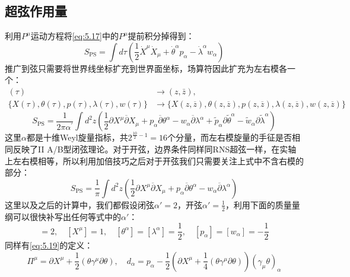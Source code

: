 \subsection{超弦作用量}
利用$P^\mu$运动方程将\ref{eq:5.17}中的$P^\mu$提前积分掉得到：
\begin{equation}
	S_{\mathrm{PS}}=\int d\tau\left(\frac{1}{2}\dot{X}^\mu\dot{X}_\mu+\dot{\theta}^\alpha p_\alpha-\dot{\lambda}^\alpha w_\alpha\right)
\end{equation}
推广到弦只需要将世界线坐标扩充到世界面坐标，场算符因此扩充为左右模各一个：
\begin{equation}
	\begin{aligned}(\tau)&\to(z,\bar{z}),\\\{X(\tau),\theta(\tau),p(\tau),\lambda(\tau),w(\tau)\}&\to\{X(z,\overline{z}),\theta(z,\overline{z}),p(z,\overline{z}),\lambda(z,\overline{z}),w(z,\overline{z})\}\end{aligned}
\end{equation}
\begin{equation}
	\boxed{
	S_{\mathrm{PS}}=\frac{1}{2\pi\alpha^{\prime}}\int d^2z\left(\frac{1}{2}\partial X^\mu\overline{\partial}X_\mu+p_\alpha\overline{\partial}\theta^\alpha-w_\alpha\overline{\partial}\lambda^\alpha+\tilde{p}_\alpha\partial\tilde{\theta}^\alpha-\tilde{w}_\alpha\partial\tilde{\lambda}^\alpha\right)
}
\end{equation}
这里$\alpha$都是十维Weyl旋量指标，共$2^{\frac{10}{2}-1}=16$个分量，而左右模旋量的手征是否相同反映了II A/B型闭弦理论。对于开弦，边界条件同样同RNS超弦一样，在实轴上左右模相等，所以利用加倍技巧之后对于开弦我们只需要关注上式中不含右模的部分：
\begin{equation}
	\label{eq:5.23}
	S_{\mathrm{PS}}=\frac{1}{\pi}\int d^2z\left(\frac{1}{2}\partial X^\mu\overline{\partial}X_\mu+p_\alpha\overline{\partial}\theta^\alpha-w_\alpha\overline{\partial}\lambda^\alpha\right)
\end{equation}
这里以及之后的计算中，我们都假设闭弦$\alpha' = 2$，开弦$\alpha'=\frac12$，利用下面的质量量纲可以很快补写出任何等式中的$\alpha'$：
\begin{equation}
	[\alpha^{\prime}]=2,\quad[X^\mu]=1,\quad[\theta^\alpha]=[\lambda^\alpha]=\frac{1}{2},\quad[p_\alpha]=[w_\alpha]=-\frac{1}{2}
\end{equation}
同样有\ref{eq:5.19}的定义：
\begin{equation}
	\Pi^\mu=\partial X^\mu+\frac{1}{2}(\theta\gamma^\mu\partial\theta),\quad d_\alpha=p_\alpha-\frac{1}{2}{\left(\partial X^\mu+\frac{1}{4}(\theta\gamma^\mu\partial\theta)\right)}(\gamma_\mu\theta)_\alpha
\end{equation}
